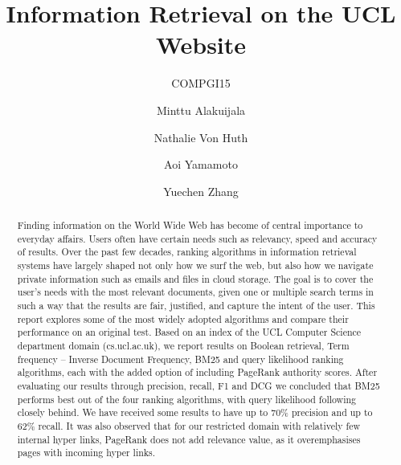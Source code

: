 \documentclass[sigconf]{acmart}
\begin{document}
\title{Information Retrieval on the UCL Website}
\subtitle{COMPGI15}


\author{Minttu Alakuijala}
\affiliation{\institution{}}

\author{Nathalie Von Huth}
\affiliation{\institution{}}

\author{Aoi Yamamoto}
\affiliation{\institution{}}

\author{Yuechen Zhang}
\affiliation{\institution{}}



\begin{abstract}
Finding information on the World Wide Web has become of central importance to everyday affairs. Users often have certain needs such as relevancy, speed and accuracy of results. Over the past few decades, ranking algorithms in information retrieval systems have largely shaped not only how we surf the web, but also how we navigate private information such as emails and files in cloud storage. The goal is to cover the user's needs with the most relevant documents, given one or multiple search terms in such a way that the results are fair, justified, and capture the intent of the user. This report explores some of the most widely adopted algorithms and compare their performance on an original test. Based on an index of the UCL Computer Science department domain (cs.ucl.ac.uk), we report results on Boolean retrieval, Term frequency -- Inverse Document Frequency, BM25 and query likelihood ranking algorithms, each with the added option of including PageRank authority scores. After evaluating our results through precision, recall, F1 and DCG we concluded that BM25 performs best out of the four ranking algorithms, with query likelihood following closely behind. We have received some results to have up to 70\% precision and up to 62\% recall. It was also observed that for our restricted domain with relatively few internal hyper links, PageRank does not add relevance value, as it overemphasises pages with incoming hyper links.
\end{abstract}

\maketitle




 
\end{document}
